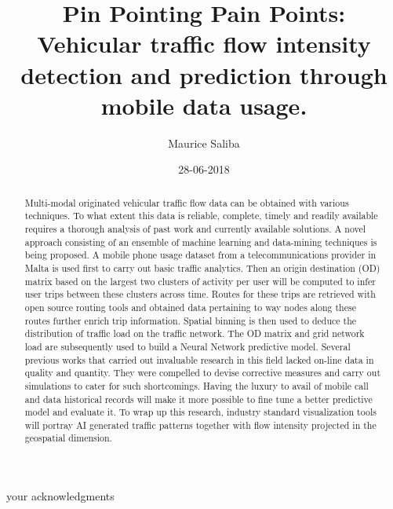 \documentclass[12pt, a4paper]{report}
\theoremstyle{definition}
\theoremstyle{definition}%
\theoremstyle{definition}%
\theoremstyle{definition}%
\theoremstyle{definition}%
\theoremstyle{definition}%
\begin{document}
\title{Pin Pointing Pain Points: Vehicular traffic flow intensity detection and prediction through mobile data usage.}
\author{Maurice Saliba}
\date{28-06-2018}

\frontmatter


\begin{acknowledgements}
your acknowledgments
\end{acknowledgements}
       
\begin{abstract}
Multi-modal originated vehicular traffic flow data can be obtained with various techniques. To what extent this data is reliable, complete, timely and readily available requires a thorough analysis of past work and currently available solutions. A novel approach consisting of an ensemble of machine learning and data-mining techniques is being proposed. 
A mobile phone usage dataset from a telecommunications provider in Malta is used first to carry out basic traffic analytics. Then an origin destination (OD) matrix based on the largest two clusters of activity per user will be computed to infer user trips between these clusters across time. Routes for these trips are retrieved with open source routing tools and obtained data pertaining to way nodes along these routes further enrich trip information. Spatial binning is then used to deduce the distribution of traffic load on the traffic network.  The OD matrix and grid network load are subsequently used to build a Neural Network predictive model. Several previous works \cite{Laurila2012,Hoteit2014} that carried out invaluable research in this field lacked on-line data in quality and quantity. They were compelled to devise corrective measures and carry out simulations to cater for such shortcomings. Having the luxury to avail of mobile call and data historical records will make it more possible to fine tune a better predictive model and evaluate it. To wrap up this research, industry standard visualization tools will portray AI generated traffic patterns together with flow intensity projected in the geospatial dimension. 
\end{abstract}

\tableofcontents

\listoffigures

\listoftables



\mainmatter
\end{document}
